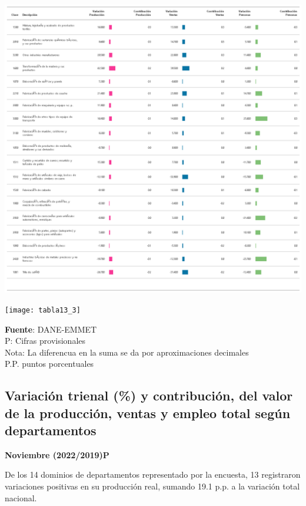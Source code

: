 \documentclass[
]{article}
\begin{document}
\begin{center}\includegraphics[width=14.78in]{tabla13_2} \end{center}

\begin{center}\texttt{[image: tabla13\_3]} \end{center}

\textbf{Fuente}: DANE-EMMET\\
P: Cifras provisionales\\
Nota: La diferencua en la suma se da por aproximaciones decimales\\
P.P. puntos porcentuales\\

\hypertarget{variaciuxf3n-trienal-y-contribuciuxf3n-del-valor-de-la-producciuxf3n-ventas-y-empleo-total-seguxfan-departamentos}{%
\subsection{Variación trienal (\%) y contribución, del valor de la
producción, ventas y empleo total según
departamentos}\label{variaciuxf3n-trienal-y-contribuciuxf3n-del-valor-de-la-producciuxf3n-ventas-y-empleo-total-seguxfan-departamentos}}

\textbf{Noviembre (2022/2019)P}

De los 14 dominios de departamentos representado por la encuesta, 13
registraron variaciones positivas en su producción real, sumando 19.1
p.p. a la variación total nacional.\\
\end{document}
